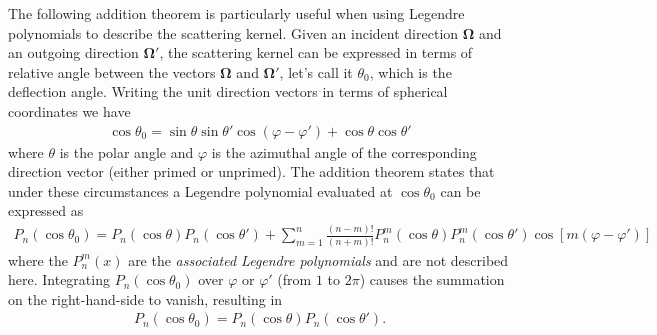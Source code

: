 \documentclass[11pt]{article}
\renewcommand\vec{\mathbf}
\begin{document}
The following addition theorem is particularly useful when using Legendre polynomials to describe the scattering kernel.  Given an incident direction \(\vec{\Omega}\) and an outgoing direction \(\vec{\Omega}'\), the scattering kernel can be expressed in terms of relative angle between the vectors \(\vec{\Omega}\) and \(\vec{\Omega}'\), let's call it \(\theta_0\), which is the deflection angle.  Writing the unit direction vectors in terms of spherical coordinates we have
\begin{align}
  \cos\theta_0 = \sin\theta \sin\theta' \cos\left(\varphi - \varphi'\right) + \cos\theta \cos\theta'
\end{align}
where \(\theta\) is the polar angle and \(\varphi\) is the azimuthal angle of the corresponding direction vector (either primed or unprimed).  The addition theorem states that under these circumstances a Legendre polynomial evaluated at \(\cos\theta_0\) can be expressed as
\begin{align}
  P_n(\cos\theta_0) = P_n(\cos\theta) P_n(\cos\theta') + \sum_{m=1}^n \frac{(n-m)!}{(n+m)!} P_n^m(\cos\theta) P_n^m(\cos\theta') \cos\left[m\left(\varphi-\varphi'\right)\right]
\end{align}
where the \(P_n^m(x)\) are the \emph{associated Legendre polynomials} and are not described here.  Integrating \(P_n(\cos\theta_0)\) over \(\varphi\) or \(\varphi'\) (from \(1\) to \(2\pi\)) causes the summation on the right-hand-side to vanish, resulting in
\begin{align}
  P_n(\cos\theta_0) = P_n(\cos\theta) P_n(\cos\theta').
\end{align}
\end{document}
